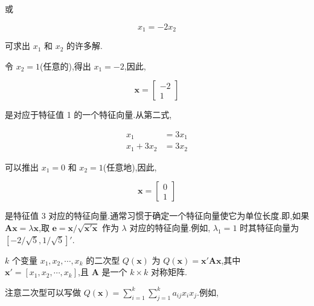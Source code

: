 或

\[
x_1 = -2x_2
\]

可求出 $x_1$ 和 $x_2$ 的许多解.

令 $x_2 = 1$(任意的),得出 $x_1 = -2$,因此,

\[
\bm{x} = \begin{bmatrix} -2 \\ 1 \end{bmatrix}
\]

是对应于特征值 1 的一个特征向量.从第二式,

\[
\begin{aligned}
x_1 &= 3x_1 \\
x_1 + 3x_2 &= 3x_2
\end{aligned}
\]

可以推出 $x_1 = 0$ 和 $x_2 = 1$(任意地),因此,

\[
\bm{x} = \begin{bmatrix} 0 \\ 1 \end{bmatrix}
\]

是特征值 3 对应的特征向量.通常习惯于确定一个特征向量使它为单位长度.即,如果 $\bm{A}\bm{x} = \lambda\bm{x}$,取 $\bm{e} = \bm{x}/\sqrt{\bm{x}'\bm{x}}$ 作为 $\lambda$ 对应的特征向量.例如, $\lambda_1 = 1$ 时其特征向量为 $[-2/\sqrt{5}, 1/\sqrt{5}]'$.

\quad $k$ 个变量 $x_1, x_2, \cdots, x_k$ 的二次型 $Q(\bm{x})$ 为 $Q(\bm{x}) = \bm{x}'\bm{A}\bm{x}$,其中 $\bm{x}' = [x_1, x_2, \cdots, x_k]$,且 $\bm{A}$ 是一个 $k \times k$ 对称矩阵.

注意二次型可以写做 $Q(\bm{x}) = \sum\limits_{i=1}^{k}\sum\limits_{j=1}^{k}a_{ij}x_i x_j$.例如,
